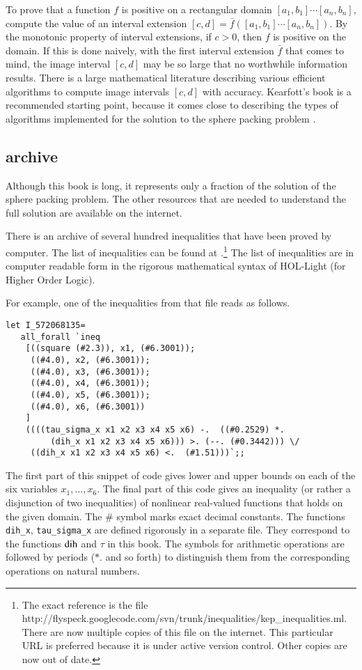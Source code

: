 To prove that a function $f$ is positive on a rectangular domain
$[a_1,b_1]\cdots[a_n,b_n]$, compute the
value of an interval extension $[c,d]=\bar f([a_1,b_1]\cdots[a_n,b_n])$.
By the monotonic property of interval extensions, if $c>0$, then $f$
is positive on the domain.  If this is done naively, with the
first interval extension $\bar f$ that comes to mind, the image interval
$[c,d]$ may be so large that no worthwhile information results.
There is a large mathematical literature describing various 
efficient algorithms
to compute image intervals $[c,d]$ with accuracy.
Kearfott's book is a recommended starting point, because it comes
close to describing the types of algorithms implemented for the
solution to the sphere packing problem \cite{Kea96}. 



\subsection{archive}

Although this book is long,  it represents only a fraction of the solution of
the sphere packing problem.  The other resources that are needed to understand
the full solution are available on the internet.

There is an archive of  several hundred
inequalities that have been proved by computer.  The list of inequalities can
be found at \cite{web}.\footnote{The exact reference is the file
http://flyspeck.googlecode.com/svn/trunk/inequalities/kep\_inequalities.ml.
There are now multiple copies of this file on the internet.  This particular
URL is preferred because it is under active version control.  Other copies are now
out of date.}    
The list of inequalities are in computer readable
form in the rigorous mathematical syntax of HOL-Light (for Higher Order Logic).

For example, one of the inequalities from that file reads as follows.
\begin{verbatim}
let I_572068135=
   all_forall `ineq 
    [((square (#2.3)), x1, (#6.3001));
     ((#4.0), x2, (#6.3001));
     ((#4.0), x3, (#6.3001));
     ((#4.0), x4, (#6.3001));
     ((#4.0), x5, (#6.3001));
     ((#4.0), x6, (#6.3001))
    ]
    ((((tau_sigma_x x1 x2 x3 x4 x5 x6) -.  ((#0.2529) *.  
         (dih_x x1 x2 x3 x4 x5 x6))) >. (--. (#0.3442))) \/ 
     ((dih_x x1 x2 x3 x4 x5 x6) <.  (#1.51)))`;;
\end{verbatim}
The first part of this snippet of code gives lower and upper bounds on each of the six variables $x_1,\ldots,x_6$.  The final part of this code gives an inequality (or rather a disjunction of two inequalities) of nonlinear real-valued functions that holds on the given domain.
The $\#$ symbol marks exact decimal constants.  The functions {\tt dih\_x}, {\tt tau\_sigma\_x} are defined rigorously in a separate file.  They correspond to the functions 
$\operatorname{dih}$ and $\tau$ in this book.  The symbols for arithmetic operations are followed by periods ($*.$ and so forth) to distinguish them from the corresponding operations on natural numbers.  

